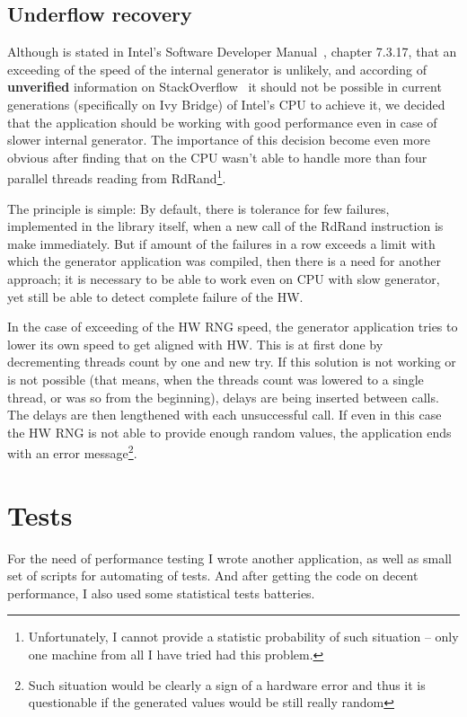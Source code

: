 \subsection{Underflow recovery}
Although is stated in Intel's Software Developer Manual~\cite{IntelSWManualVol1}, chapter 7.3.17, that an exceeding of the speed of the internal generator is unlikely, and according of {\bf unverified} information on StackOverflow~\cite{StackoverflowRDRANDCharacteristics} it should not be possible in current generations (specifically on Ivy Bridge) of Intel's CPU to achieve it, we decided that the application should be working with good performance even in case of slower internal generator. The importance of this decision become even more obvious after finding that on  the CPU wasn't able to handle more than four parallel threads reading from RdRand\footnote{Unfortunately, I cannot provide a statistic probability of such situation -- only one machine from all I have tried had this problem.}.

The principle is simple: By default, there is tolerance for few failures, implemented in the library itself, when a new call of the RdRand instruction is make immediately. But if amount of the failures in a row exceeds a limit with which the generator application was compiled, then there is a need for another approach; it is necessary to be able to work even on CPU with slow generator, yet still be able to detect complete failure of the HW.

In the case of exceeding of the HW RNG speed, the generator application tries to lower its own speed to get aligned with HW. This is at first done by decrementing threads count by one and new try. If this solution is not working or is not possible (that means, when the threads count was lowered to a single thread, or was so from the beginning), delays are being inserted between calls. The delays are then lengthened with each unsuccessful call. If even in this case the HW RNG is not able to provide enough random values, the application ends with an error message\footnote{Such situation would be clearly a sign of a hardware error and thus it is questionable if the generated values would be still really random}.

\section{Tests} \label{sec:tests}
For the need of performance testing I wrote another application, as well as small set of scripts for automating of tests. And after getting the code on decent performance, I also used some statistical tests batteries.


